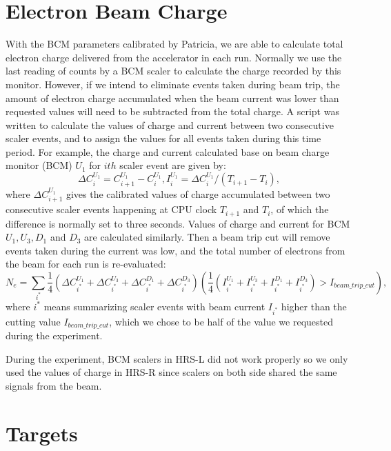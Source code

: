 \documentclass[a4paper,12.pt]{article}
\begin{document}
\section{Electron Beam Charge}
 With the BCM parameters calibrated by Patricia, we are able to calculate total electron charge delivered from the accelerator in each run. Normally we use the last reading of counts by a BCM scaler to calculate the charge recorded by this monitor. However, if we intend to eliminate events taken during beam trip, the amount of electron charge accumulated when the beam current was lower than requested values will need to be subtracted from the total charge. A script was written to calculate the values of charge and current between two consecutive scaler events, and to assign the values for all events taken during this time period. For example, the charge and current calculated base on beam charge monitor (BCM) $U_{1}$ for $ith$ scaler event are given by:
\begin{equation}
  \Delta C_{i}^{U_{1}} = C_{i+1}^{U_{1}} - C_{i}^{U_{1}},  I_{i}^{U_{1}} = \Delta C_{i}^{U_{1}}/(T_{i+1}-T_{i}),
\end{equation}
where $\Delta C_{i+1}^{U_{1}}$ gives the calibrated values of charge accumulated between two consecutive scaler events happening at CPU clock $T_{i+1}$ and $T_{i}$, of which the difference is normally set to three seconds. Values of charge and current for BCM $U_{1}, U_{3}, D_{1}$ and $D_{3}$ are calculated similarly. Then a beam trip cut will remove events taken during the current was low, and the total number of electrons from the beam for each run is re-evaluated:
\begin{equation}
  N_{e} = \sum_{i^{*}} \frac{1}{4}(\Delta C_{i^{*}}^{U_{1}}+\Delta C_{i^{*}}^{U_{3}}+\Delta C_{i^{*}}^{D_{1}}+\Delta C_{i^{*}}^{D_{3}})(\frac{1}{4}(I_{i^{*}}^{U_{1}}+I_{i^{*}}^{U_{3}}+I_{i^{*}}^{D_{1}}+I_{i^{*}}^{D_{3}})>I_{beam\_trip\_cut}),
  \label{eq_ne}
\end{equation}
where $i^{*}$ means summarizing scaler events with beam current $I_{i^{*}}$ higher than the cutting value $I_{beam\_trip\_cut}$, which we chose to be half of the value we requested during the experiment.

During the experiment, BCM scalers in HRS-L did not work properly so we only used the values of charge in HRS-R since scalers on both side shared the same signals from the beam.

\section{Targets}
\end{document}
